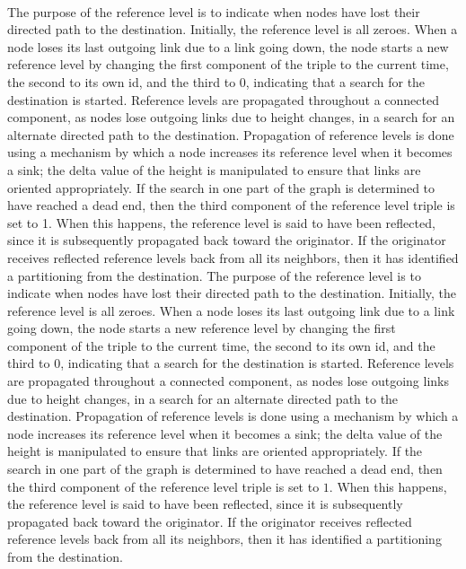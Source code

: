 \paragraph{}The purpose of the reference level is to indicate when nodes have lost their directed path to the destination. Initially, the reference level is all zeroes. When a node loses its last outgoing link due to a link going down, the node starts a new reference level by changing the first component of the triple to the current time, the second to its own id, and the third to $0$, indicating that a search for the destination is started. Reference levels are propagated throughout a connected component, as nodes lose outgoing links due to height changes, in a search for an alternate directed path to the destination. Propagation of reference levels is done using a mechanism by which a node increases its reference level when it becomes a sink; the delta value of the height is manipulated to ensure that links are oriented appropriately. If the search in one part of the graph is determined to have reached a dead end, then the third component of the reference level triple is set to 1. When this happens, the reference level is said to have been reflected, since it is subsequently propagated back toward the originator. If the originator receives reflected reference levels back from all its neighbors, then it has identified a partitioning from the destination. The purpose of the reference level is to indicate when nodes have lost their directed path to the destination. Initially, the reference level is all zeroes. When a node loses its last outgoing link due to a link going down, the node starts a new reference level by changing the first component of the triple to the current time, the second to its own id, and the third to $0$, indicating that a search for the destination is started. Reference levels are propagated throughout a connected component, as nodes lose outgoing links due to height changes, in a search for an alternate directed path to the destination. Propagation of reference levels is done using a mechanism by which a node increases its reference level when it becomes a sink; the delta value of the height is manipulated to ensure that links are oriented appropriately. If the search in one part of the graph is determined to have reached a dead end, then the third component of the reference level triple is set to $1$. When this happens, the reference level is said to have been reflected, since it is subsequently propagated back toward the originator. If the originator receives reflected reference levels back from all its neighbors, then it has identified a partitioning from the destination.
